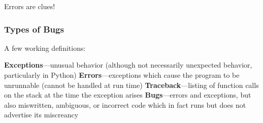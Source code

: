 \documentclass[11pt]{beamer}
\begin{document}
{ 
    \begin{frame}[plain]
        Errors are clues!
     \end{frame}
}

\begin{frame}[fragile]
  \frametitle{Types of Bugs}
  \Enlarge

  \begin{enumerate}
  \myitem  A few working definitions:
  \begin{enumerate}
    \mysubitem  \textbf{Exceptions}---unusual behavior (although not necessarily unexpected behavior, particularly in Python) %
    \mysubitem  \textbf{Errors}---exceptions which cause the program to be unrunnable (cannot be handled at run time) %
    \mysubitem  \textbf{Traceback}---listing of function calls on the stack at the time the exception arises %
    \mysubitem  \textbf{Bugs}---errors and exceptions, but also miswritten, ambiguous, or incorrect code which in fact runs but does not advertise its miscreancy
    \end{enumerate}
  \end{enumerate}
\end{frame}
\end{document}
